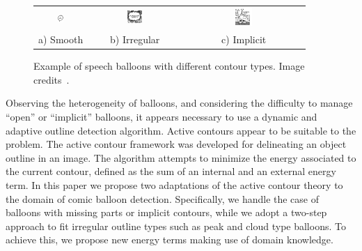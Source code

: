 	\begin{figure}[!ht]%
	\begin{center}
	  \begin{tabular}{ccc}
	  \includegraphics[trim= 0px 2px 0mm 0mm, clip, width=0.13\textwidth]{round_balloon.png}&
	  \includegraphics[trim= 0mm 0mm 0mm 0mm, clip, width=0.17\textwidth]{peaked_balloon.png}&
	  \includegraphics[trim= 15px 7mm 5px 0mm, clip, width=0.145\textwidth]{open_balloon.png} \\ 
	  \footnotesize a) Smooth	& \footnotesize b) Irregular & \footnotesize c) Implicit
	  \end{tabular}
	\caption[Speech balloon contour types]{Example of speech balloons with different contour types. Image credits~\cite{Bubble09}.}
	\label{fig:se:balloon_examples}
	\end{center}
	\end{figure}	

Observing the heterogeneity of balloons, and considering the difficulty to manage ``open'' or ``implicit'' balloons, it appears necessary to use a dynamic and adaptive outline detection algorithm.
Active contours appear to be suitable to the problem.
The active contour framework was developed for delineating an object outline in an image.
The algorithm attempts to minimize the energy associated to the current contour, defined as the sum of an internal and an external energy term. 
In this paper we propose two adaptations of the active contour theory to the domain of comic balloon detection.
Specifically, we handle the case of balloons with missing parts or implicit contours, while we adopt a two-step approach to fit irregular outline types such as peak and cloud type balloons. 
To achieve this, we propose new energy terms making use of domain knowledge.


